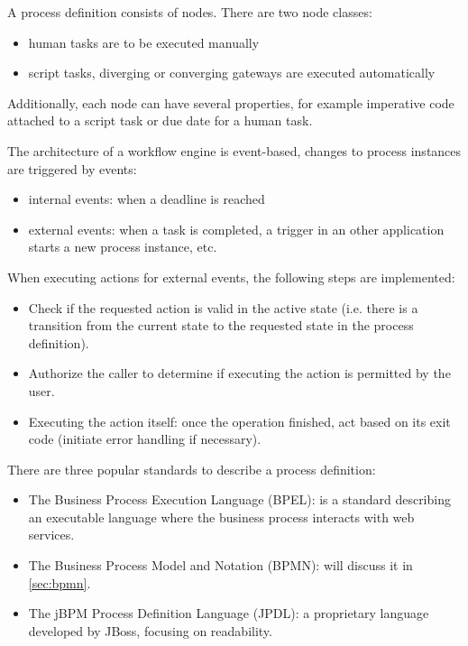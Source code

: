 A process definition consists of nodes. There are two node classes:

\begin{itemize}
\item human tasks are to be executed manually
\item script tasks, diverging or converging gateways are executed automatically
\end{itemize}

Additionally, each node can have several properties, for example imperative code
attached to a script task or due date for a human task.

The architecture of a workflow engine is event-based, changes to process
instances are triggered by events:

\begin{itemize}
\item internal events: when a deadline is reached
\item external events: when a task is completed, a trigger in an other
application starts a new process instance, etc.
\end{itemize}

When executing actions for external events, the following steps are implemented:

\begin{itemize}
\item Check if the requested action is valid in the active state (i.e. there is a transition from the current state to the requested state in the process definition).
\item Authorize the caller to determine if executing the action is permitted by the user.
\item Executing the action itself: once the operation finished, act based on its exit code (initiate error handling if necessary).
\end{itemize}

There are three popular standards to describe a process definition:

\begin{itemize}
\item The Business Process Execution Language (BPEL): is a standard describing an
executable language where the business process interacts with web services.
\item The Business Process Model and Notation (BPMN): will discuss it in \autoref{sec:bpmn}.
\item The jBPM Process Definition Language (JPDL): a proprietary language developed
by JBoss, focusing on readability.
\end{itemize}

